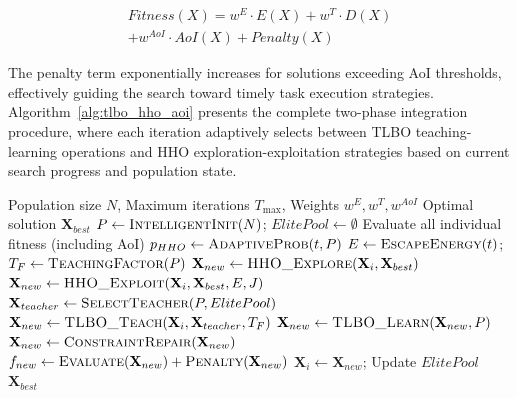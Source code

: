 \documentclass[conference]{IEEEtran}
\begin{document}
\begin{equation}
    \begin{split}
        Fitness(X) = w^E \cdot E(X) + w^T \cdot D(X) \\ 
        + w^{AoI} \cdot AoI(X) + Penalty(X) 
    \end{split} 
    \label{con:Fitness}
\end{equation}

The penalty term exponentially increases for solutions exceeding AoI thresholds, effectively guiding the search toward timely task execution strategies. Algorithm~\ref{alg:tlbo_hho_aoi} presents the complete two-phase integration procedure, where each iteration adaptively selects between TLBO teaching-learning operations and HHO exploration-exploitation strategies based on current search progress and population state.

\begin{algorithm}[!t]
  \small
  \caption{TLBO-HHO Two-Phase Integration Algorithm (with AoI Optimization)}
  \label{alg:tlbo_hho_aoi}
  \begin{algorithmic}[1]
    \REQUIRE Population size $N$, Maximum iterations $T_{\max}$, Weights $w^E, w^T, w^{AoI}$
    \ENSURE Optimal solution $\mathbf{X}_{best}$
    \STATE $P \leftarrow \textsc{IntelligentInit}(N)$; $ElitePool \leftarrow \emptyset$
    \STATE Evaluate all individual fitness (including AoI)
        \STATE $p_{HHO} \leftarrow \textsc{AdaptiveProb}(t, P)$
        \STATE $E \leftarrow \textsc{EscapeEnergy}(t)$; $T_F \leftarrow \textsc{TeachingFactor}(P)$
                    \STATE $\mathbf{X}_{new} \leftarrow \textsc{HHO\_Explore}(\mathbf{X}_i, \mathbf{X}_{best})$
                \ELSE
                    \STATE $\mathbf{X}_{new} \leftarrow \textsc{HHO\_Exploit}(\mathbf{X}_i, \mathbf{X}_{best}, E, J)$
                \ENDIF
            \ELSE
                \STATE $\mathbf{X}_{teacher} \leftarrow \textsc{SelectTeacher}(P, ElitePool)$
                \STATE $\mathbf{X}_{new} \leftarrow \textsc{TLBO\_Teach}(\mathbf{X}_i, \mathbf{X}_{teacher}, T_F)$
                \STATE $\mathbf{X}_{new} \leftarrow \textsc{TLBO\_Learn}(\mathbf{X}_{new}, P)$
            \ENDIF
            \STATE $\mathbf{X}_{new} \leftarrow \textsc{ConstraintRepair}(\mathbf{X}_{new})$
            \STATE $f_{new} \leftarrow \textsc{Evaluate}(\mathbf{X}_{new}) + \textsc{Penalty}(\mathbf{X}_{new})$
                \STATE $\mathbf{X}_i \leftarrow \mathbf{X}_{new}$; Update $ElitePool$
            \ENDIF
        \ENDFOR
    \ENDFOR
    \RETURN $\mathbf{X}_{best}$
  \end{algorithmic}
\end{algorithm}
\end{document}
